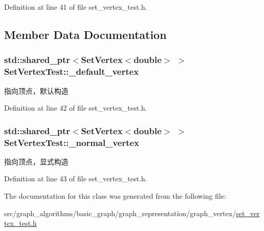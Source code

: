 Definition at line 41 of file set\+\_\+vertex\+\_\+test.\+h.



\subsection{Member Data Documentation}
\hypertarget{class_set_vertex_test_a886fbbe6fd5a4e4c954f2ff38951f90b}{}
\subsubsection[{\+\_\+default\+\_\+vertex}]{\setlength{\rightskip}{0pt plus 5cm}std\+::shared\+\_\+ptr$<${\bf Set\+Vertex}$<$double$>$ $>$ Set\+Vertex\+Test\+::\+\_\+default\+\_\+vertex\hspace{0.3cm}{\ttfamily [protected]}}\label{class_set_vertex_test_a886fbbe6fd5a4e4c954f2ff38951f90b}
指向顶点，默认构造 

Definition at line 42 of file set\+\_\+vertex\+\_\+test.\+h.

\hypertarget{class_set_vertex_test_af78af1aa633b65214ed39e8956beee39}{}
\subsubsection[{\+\_\+normal\+\_\+vertex}]{\setlength{\rightskip}{0pt plus 5cm}std\+::shared\+\_\+ptr$<${\bf Set\+Vertex}$<$double$>$ $>$ Set\+Vertex\+Test\+::\+\_\+normal\+\_\+vertex\hspace{0.3cm}{\ttfamily [protected]}}\label{class_set_vertex_test_af78af1aa633b65214ed39e8956beee39}
指向顶点，显式构造 

Definition at line 43 of file set\+\_\+vertex\+\_\+test.\+h.



The documentation for this class was generated from the following file\+:\begin{DoxyCompactItemize}
\item 
src/graph\+\_\+algorithms/basic\+\_\+graph/graph\+\_\+representation/graph\+\_\+vertex/\hyperlink{set__vertex__test_8h}{set\+\_\+vertex\+\_\+test.\+h}\end{DoxyCompactItemize}
